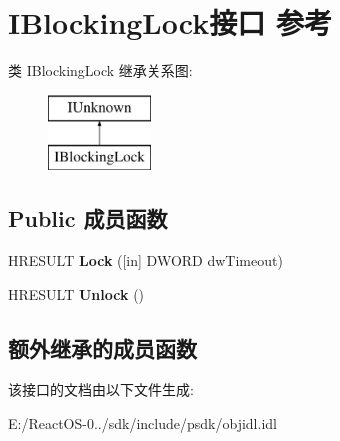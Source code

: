 \hypertarget{interface_i_blocking_lock}{}\section{I\+Blocking\+Lock接口 参考}
\label{interface_i_blocking_lock}
类 I\+Blocking\+Lock 继承关系图\+:\begin{figure}[H]
\begin{center}
\leavevmode
\includegraphics[height=2.000000cm]{interface_i_blocking_lock}
\end{center}
\end{figure}
\subsection*{Public 成员函数}
\begin{DoxyCompactItemize}
\item 
\mbox{\label{interface_i_blocking_lock_ad24feb886bfa565eefa27b6d196ba91a}} 
H\+R\+E\+S\+U\+LT {\bfseries Lock} (\mbox{[}in\mbox{]} D\+W\+O\+RD dw\+Timeout)
\item 
\mbox{\label{interface_i_blocking_lock_acbd81311a0c903d0700d15f8590ceb5e}} 
H\+R\+E\+S\+U\+LT {\bfseries Unlock} ()
\end{DoxyCompactItemize}
\subsection*{额外继承的成员函数}


该接口的文档由以下文件生成\+:\begin{DoxyCompactItemize}
\item 
E\+:/\+React\+O\+S-\/0../sdk/include/psdk/objidl.\+idl\end{DoxyCompactItemize}
